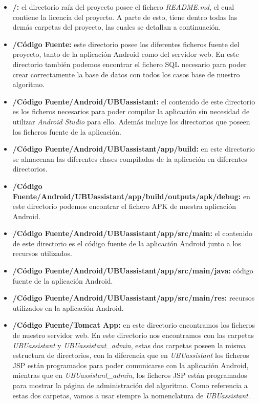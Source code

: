 \begin{itemize}
	\tightlist
	\item
	\textbf{/:} el directorio raíz del proyecto posee el fichero \textit{README.md}, el cual contiene la licencia del proyecto. A parte de esto, tiene dentro todas las demás carpetas del proyecto, las cuales se detallan a continuación.
	\item 
	\textbf{/Código Fuente:} este directorio posee los diferentes ficheros fuente del proyecto, tanto de la aplicación Android como del servidor web. En este directorio también podemos encontrar el fichero SQL necesario para poder crear correctamente la base de datos con todos los casos base de nuestro algoritmo.
	\item 
	\textbf{/Código Fuente/Android/UBUassistant:} el contenido de este directorio es los ficheros necesarios para poder compilar la aplicación sin necesidad de utilizar \textit{Android Studio} para ello. Además incluye los directorios que poseen los ficheros fuente de la aplicación.
	\item 
	\textbf{/Código Fuente/Android/UBUassistant/app/build:} en este directorio se almacenan las diferentes clases compiladas de la aplicación en diferentes directorios.
	\item 
	\textbf{/Código Fuente/Android/UBUassistant/app/build/outputs/apk/debug:} en este directorio podemos encontrar el fichero APK de nuestra aplicación Android.
	\item 
	\textbf{/Código Fuente/Android/UBUassistant/app/src/main:} el contenido de este directorio es el código fuente de la aplicación Android junto a los recursos utilizados.
	\item 
	\textbf{/Código Fuente/Android/UBUassistant/app/src/main/java:} código fuente de la aplicación Android.
	\item 
	\textbf{/Código Fuente/Android/UBUassistant/app/src/main/res:} recursos utilizados en la aplicación Android.
	\item 
	\textbf{/Código Fuente/Tomcat App:} en este directorio encontramos los ficheros de nuestro servidor web. En este directorio nos encontramos con las carpetas \textit{UBUassistant} y \textit{UBUassistant\_admin}, estas dos carpetas poseen la misma estructura de directorios, con la diferencia que en \textit{UBUassistant} los ficheros JSP están programados para poder comunicarse con la aplicación Android, mientras que en \textit{UBUassistant\_admin}, los ficheros JSP están programados para mostrar la página de administración del algoritmo. Como referencia a estas dos carpetas, vamos a usar siempre la nomenclatura de \textit{UBUassistant}.

\end{itemize}
